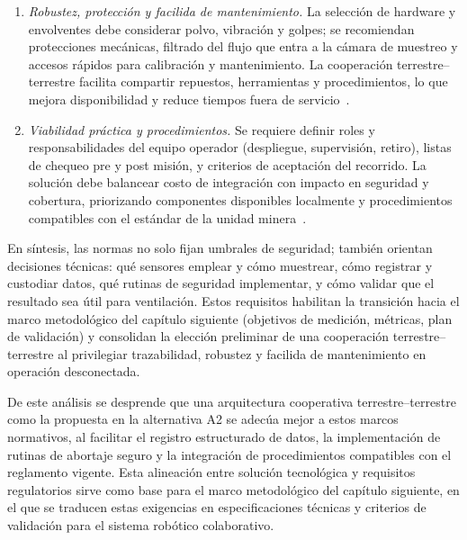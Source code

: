 \begin{enumerate}
\item \textit{Robustez, protección y facilida de mantenimiento.} La selección de hardware y envolventes debe considerar polvo, vibración y golpes; se recomiendan protecciones mecánicas, filtrado del flujo que entra a la cámara de muestreo y accesos rápidos para calibración y mantenimiento. La cooperación terrestre--terrestre facilita compartir repuestos, herramientas y procedimientos, lo que mejora disponibilidad y reduce tiempos fuera de servicio~\cite{AdvancesMining_2023}.
\item \textit{Viabilidad práctica y procedimientos.} Se requiere definir roles y responsabilidades del equipo operador (despliegue, supervisión, retiro), listas de chequeo pre y post misión, y criterios de aceptación del recorrido. La solución debe balancear costo de integración con impacto en seguridad y cobertura, priorizando componentes disponibles localmente y procedimientos compatibles con el estándar de la unidad minera~\cite{MINEM_DS024_2016,OSINERGMIN_BoletinGSM_2020b}.
\end{enumerate}

En síntesis, las normas no solo fijan umbrales de seguridad; también orientan decisiones técnicas: qué sensores emplear y cómo muestrear, cómo registrar y custodiar datos, qué rutinas de seguridad implementar, y cómo validar que el resultado sea útil para ventilación. Estos requisitos habilitan la transición hacia el marco metodológico del capítulo siguiente (objetivos de medición, métricas, plan de validación) y consolidan la elección preliminar de una cooperación terrestre--terrestre al privilegiar trazabilidad, robustez y facilida de mantenimiento en operación desconectada.

De este análisis se desprende que una arquitectura cooperativa terrestre--terrestre como la propuesta en la alternativa A2 se adecúa mejor a estos marcos normativos, al facilitar el registro estructurado de datos, la implementación de rutinas de abortaje seguro y la integración de procedimientos compatibles con el reglamento vigente. Esta alineación entre solución tecnológica y requisitos regulatorios sirve como base para el marco metodológico del capítulo siguiente, en el que se traducen estas exigencias en especificaciones técnicas y criterios de validación para el sistema robótico colaborativo.

